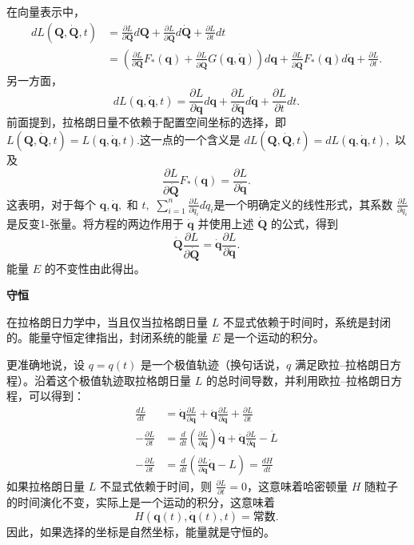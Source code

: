 在向量表示中，
\begin{equation}
\begin{aligned}
dL(\mathbf {Q}, {\dot {\mathbf {Q}}}, t) &= \frac{\partial L}{\partial \mathbf {Q}} d\mathbf {Q} + \frac{\partial L}{\partial {\dot {\mathbf {Q}}}} d{\dot {\mathbf {Q}}} + \frac{\partial L}{\partial t} dt\\
&= \left(\frac{\partial L}{\partial \mathbf {Q}} F_{*}(\mathbf {q}) + \frac{\partial L}{\partial {\dot {\mathbf {Q}}}} G(\mathbf {q}, {\dot {\mathbf {q}}})\right) d\mathbf {q} + \frac{\partial L}{\partial {\dot {\mathbf {Q}}}} F_{*}(\mathbf {q}) d{\dot {\mathbf {q}}} + \frac{\partial L}{\partial t}.
\end{aligned}~
\end{equation}
另一方面，
\[
dL(\mathbf {q}, {\dot {\mathbf {q}}}, t) = \frac{\partial L}{\partial \mathbf {q}} d\mathbf {q} + \frac{\partial L}{\partial {\dot {\mathbf {q}}}} d{\dot {\mathbf {q}}} + \frac{\partial L}{\partial t} dt.~
\]
前面提到，拉格朗日量不依赖于配置空间坐标的选择，即 \(L(\mathbf{Q}, \dot{\mathbf{Q}}, t) = L(\mathbf{q}, \dot{\mathbf{q}}, t).\)这一点的一个含义是 \(dL(\mathbf{Q}, \dot{\mathbf{Q}}, t) = dL(\mathbf{q}, \dot{\mathbf{q}}, t),\)
以及 
\[
\frac{\partial L}{\partial \dot{\mathbf{Q}}} F_{*}(\mathbf{q}) = \frac{\partial L}{\partial \dot{\mathbf{q}}}.~
\]
这表明，对于每个 \( \mathbf{q}, \dot{\mathbf{q}}, \) 和 \( t, \) \(\sum_{i=1}^{n} \frac{\partial L}{\partial \dot{q}_{i}} d\dot{q}_{i}\)是一个明确定义的线性形式，其系数 \(\frac{\partial L}{\partial \dot{q}_{i}}\)是反变1-张量。将方程的两边作用于 \( \dot{\mathbf{q}} \) 并使用上述 \( \dot{\mathbf{Q}} \) 的公式，得到 
\[
\dot{\mathbf{Q}} \frac{\partial L}{\partial \dot{\mathbf{Q}}} = \dot{\mathbf{q}} \frac{\partial L}{\partial \dot{\mathbf{q}}}.~
\] 
能量 \( E \) 的不变性由此得出。

\textbf{守恒}

在拉格朗日力学中，当且仅当拉格朗日量 \( L \) 不显式依赖于时间时，系统是封闭的。能量守恒定律指出，封闭系统的能量 \( E \) 是一个运动的积分。

更准确地说，设 \( q = q(t) \) 是一个极值轨迹（换句话说，\( q \) 满足欧拉–拉格朗日方程）。沿着这个极值轨迹取拉格朗日量 \( L \) 的总时间导数，并利用欧拉–拉格朗日方程，可以得到：
\[
\begin{aligned}
\frac{dL}{dt} &= \dot{\mathbf{q}} \frac{\partial L}{\partial \mathbf{q}} + \ddot{\mathbf{q}} \frac{\partial L}{\partial \dot{\mathbf{q}}} + \frac{\partial L}{\partial t} \\
- \frac{\partial L}{\partial t} &= \frac{d}{dt}\left(\frac{\partial L}{\partial \dot{\mathbf{q}}}\right) \dot{\mathbf{q}} + \ddot{\mathbf{q}} \frac{\partial L}{\partial \dot{\mathbf{q}}} - \dot{L} \\
- \frac{\partial L}{\partial t} &= \frac{d}{dt}\left(\frac{\partial L}{\partial \dot{\mathbf{q}}} \dot{\mathbf{q}} - L\right) = \frac{dH}{dt}
\end{aligned}~
\]
如果拉格朗日量 \( L \) 不显式依赖于时间，则 \( \frac{\partial L}{\partial t} = 0 \)，这意味着哈密顿量 \( H \) 随粒子的时间演化不变，实际上是一个运动的积分，这意味着 
\[
H(\mathbf{q}(t), \dot{\mathbf{q}}(t), t) = \text{常数}.~
\] 
因此，如果选择的坐标是自然坐标，能量就是守恒的。

